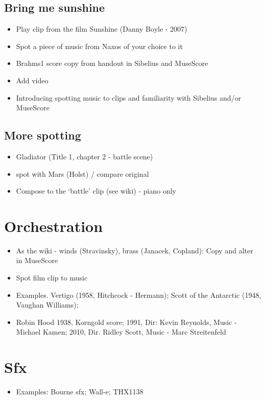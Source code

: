 \subsection{Bring me sunshine} 
\begin{itemize}
\item Play clip from the film Sunshine (Danny Boyle - 2007) 
\item Spot a piece of music from Naxos of your choice to it
\item Brahms1 score copy from handout in Sibelius and MuseScore 
\item Add video
\item Introducing spotting music to clips and familiarity with Sibelius and/or MuseScore
\end{itemize}


\subsection{More spotting}
\begin{itemize}
\item Gladiator (Title 1, chapter 2 - battle scene)
\item spot with Mars (Holst) / compare original
\item Compose to the `battle' clip (see wiki) - piano only
\end{itemize}

\section{Orchestration}
\begin{itemize}
\item As the wiki - winds (Stravinsky), brass (Janacek, Copland): Copy and alter in MuseScore
\item Spot film clip to music
\item Examples. Vertigo (1958, Hitchcock - Hermann); Scott of the Antarctic (1948, Vaughan Williams); 
\item Robin Hood 1938, Korngold score; 1991, Dir: Kevin Reynolds, Music - Michael Kamen; 2010, Dir. Ridley Scott, Music - Marc Streitenfeld  
\end{itemize}

\section{Sfx}
\begin{itemize}
\item Examples: Bourne sfx; Wall-e; THX1138

\end{itemize}

